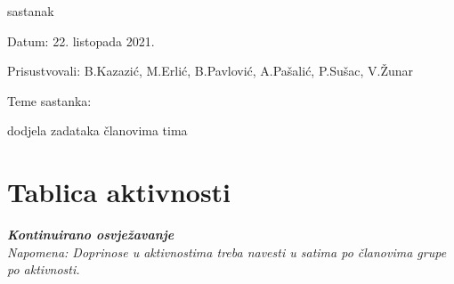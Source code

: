 \begin{packed_enum}
			\item  sastanak
			\item[] \begin{packed_item}
				\item Datum: 22. listopada 2021.
				\item Prisustvovali: B.Kazazić, M.Erlić, B.Pavlović, A.Pašalić, P.Sušac, V.Žunar
				\item Teme sastanka:
				\begin{packed_item}
					\item dodjela zadataka članovima tima
				\end{packed_item}
			\end{packed_item}
			
		\end{packed_enum}
		
		\eject
		\section*{Tablica aktivnosti}
		
			\textbf{\textit{Kontinuirano osvježavanje}}\\
			
			 \textit{Napomena: Doprinose u aktivnostima treba navesti u satima po članovima grupe po aktivnosti.}
					
						
			
